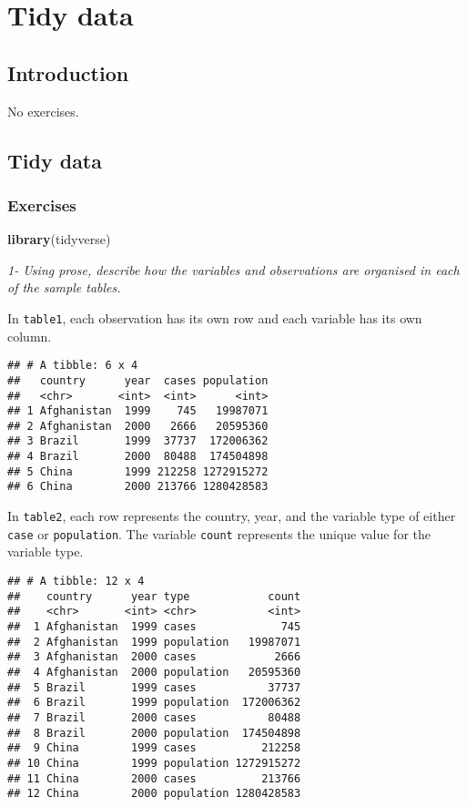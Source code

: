 \documentclass[]{article}
\newenvironment{Shaded}{\begin{snugshade}}{\end{snugshade}}
\newcommand{\KeywordTok}[1]{\textcolor[rgb]{0.13,0.29,0.53}{\textbf{#1}}}
\newcommand{\NormalTok}[1]{#1}
\theoremstyle{definition}
\theoremstyle{definition}
\theoremstyle{definition}
\theoremstyle{remark}
\begin{document}
\section{Tidy data}\label{tidy-data}

\subsection{Introduction}\label{introduction-8}

No exercises.

\subsection{Tidy data}\label{tidy-data-1}

\subsubsection{Exercises}\label{exercises-21}

\begin{Shaded}
\begin{Highlighting}[]
\KeywordTok{library}\NormalTok{(tidyverse)}
\end{Highlighting}
\end{Shaded}

\emph{1- Using prose, describe how the variables and observations are
organised in each of the sample tables.}

In \texttt{table1}, each observation has its own row and each variable
has its own column.

\begin{verbatim}
## # A tibble: 6 x 4
##   country      year  cases population
##   <chr>       <int>  <int>      <int>
## 1 Afghanistan  1999    745   19987071
## 2 Afghanistan  2000   2666   20595360
## 3 Brazil       1999  37737  172006362
## 4 Brazil       2000  80488  174504898
## 5 China        1999 212258 1272915272
## 6 China        2000 213766 1280428583
\end{verbatim}

In \texttt{table2}, each row represents the country, year, and the
variable type of either \texttt{case} or \texttt{population}. The
variable \texttt{count} represents the unique value for the variable
type.

\begin{verbatim}
## # A tibble: 12 x 4
##    country      year type            count
##    <chr>       <int> <chr>           <int>
##  1 Afghanistan  1999 cases             745
##  2 Afghanistan  1999 population   19987071
##  3 Afghanistan  2000 cases            2666
##  4 Afghanistan  2000 population   20595360
##  5 Brazil       1999 cases           37737
##  6 Brazil       1999 population  172006362
##  7 Brazil       2000 cases           80488
##  8 Brazil       2000 population  174504898
##  9 China        1999 cases          212258
## 10 China        1999 population 1272915272
## 11 China        2000 cases          213766
## 12 China        2000 population 1280428583
\end{verbatim}
\end{document}
